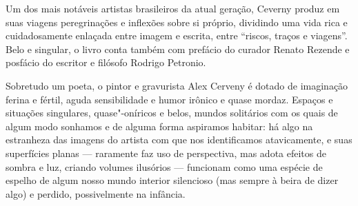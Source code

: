 Um dos mais notáveis artistas brasileiros da atual geração, Ceverny produz em suas viagens peregrinações e inflexões sobre si próprio, dividindo uma vida rica e cuidadosamente enlaçada entre imagem e escrita, entre “riscos, traços e viagens”. Belo e singular, o livro conta também com prefácio do curador Renato Rezende e posfácio do escritor e filósofo Rodrigo Petronio.

\vfill

\hspace*{-.4cm}\begin{minipage}[c]{.5\linewidth}
\small{
{}}
\end{minipage}

\pagebreak

\vspace*{1.5cm}


\bigskip

\hfill{}

\bigskip
\bigskip
\bigskip


Sobretudo um poeta, o pintor e gravurista Alex Cerveny é dotado de imaginação ferina e fértil, aguda sensibilidade e humor irônico e quase mordaz. Espaços e situações singulares, quase"-oníricos e belos, mundos solitários com os quais de algum modo sonhamos e de alguma forma aspiramos habitar: há algo na estranheza das imagens do artista com que nos identificamos atavicamente, e suas superfícies planas — raramente faz uso de perspectiva, mas adota efeitos de sombra e luz, criando volumes ilusórios — funcionam como uma espécie de espelho de algum nosso mundo interior silencioso (mas sempre à beira de dizer algo) e perdido, possivelmente na infância.

